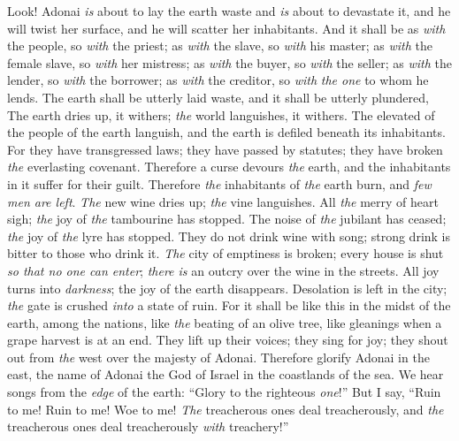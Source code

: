 \begin{biblechapter} %
 Look! Adonai \textit{is} about to lay the earth waste 
and \textit{is} about to devastate it, 
and he will twist her surface, 
and he will scatter her inhabitants.
\verse And it shall be as \textit{with} the people, so \textit{with} the priest; 
as \textit{with} the slave, so \textit{with} his master; 
as \textit{with} the female slave, so \textit{with} her mistress; 
as \textit{with} the buyer, so \textit{with} the seller; 
as \textit{with} the lender, so \textit{with} the borrower; 
as \textit{with} the creditor, so \textit{with} \textit{the one} to whom he lends.
\verse The earth shall be utterly laid waste, 
and it shall be utterly plundered,
\verse The earth dries up, it withers; 
\textit{the} world languishes, it withers. 
The elevated of the people of the earth languish,
\verse and the earth is defiled beneath its inhabitants. 
For they have transgressed laws; 
they have passed by statutes; 
they have broken \textit{the} everlasting covenant.
\verse Therefore a curse devours \textit{the} earth, 
and the inhabitants in it suffer for their guilt. 
Therefore \textit{the} inhabitants of \textit{the} earth burn, 
and \textit{few men are left}.
\verse \textit{The} new wine dries up; 
\textit{the} vine languishes. 
All \textit{the} merry of heart sigh;
\verse \textit{the} joy of \textit{the} tambourine has stopped. 
The noise of \textit{the} jubilant has ceased; 
\textit{the} joy of \textit{the} lyre has stopped.
\verse They do not drink wine with song; 
strong drink is bitter to those who drink it.
\verse \textit{The} city of emptiness is broken; 
every house is shut \textit{so that no one can enter};
\verse \textit{there is} an outcry over the wine in the streets. 
All joy turns into \textit{darkness}; 
the joy of the earth disappears.
\verse Desolation is left in the city; 
\textit{the} gate is crushed \textit{into} a state of ruin.
\verse For it shall be like this in the midst of the earth, 
among the nations, 
like \textit{the} beating of an olive tree, 
like gleanings when a grape harvest is at an end.
\verse They lift up their voices; they sing for joy; 
they shout out from \textit{the} west over the majesty of Adonai.
\verse Therefore glorify Adonai in the east, 
the name of Adonai the God of Israel in the coastlands of the sea.
\verse We hear songs from the \textit{edge} of the earth: 
“Glory to the righteous \textit{one}!” 
But I say, “Ruin to me! 
Ruin to me! Woe to me! 
\textit{The} treacherous ones deal treacherously, 
and \textit{the} treacherous ones deal treacherously \textit{with} treachery!”

\end{biblechapter}
